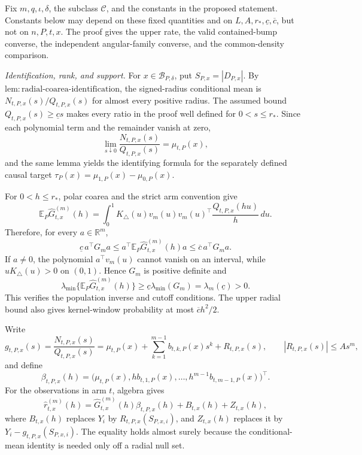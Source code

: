 Fix \(m,q,\iota,\delta\), the subclass \(\mathcal C\), and the constants in the proposed statement.  Constants below may depend on these fixed quantities and on \(L,A,r_*,\underline c,\overline c\), but not on \(n,P,t,x\).  The proof gives the upper rate, the valid contained-bump converse, the independent angular-family converse, and the common-density comparison.

\emph{Identification, rank, and support.}
For \(x\in\mathcal B_{P,\delta}\), put \(S_{P,x}=|D_{P,x}|\).  By \(\mathrm{lem:radial\text{-}coarea\text{-}identification}\), the signed-radius conditional mean is \(N_{t,P,x}(s)/Q_{t,P,x}(s)\) for almost every positive radius.  The assumed bound \(Q_{t,P,x}(s)\geq\underline c s\) makes every ratio in the proof well defined for \(0<s\leq r_*\).  Since each polynomial term and the remainder vanish at zero,
\[
\lim_{s\downarrow0}\frac{N_{t,P,x}(s)}{Q_{t,P,x}(s)}=\mu_{t,P}(x),
\]
and the same lemma yields the identifying formula for the separately defined causal target \(\tau_P(x)=\mu_{1,P}(x)-\mu_{0,P}(x)\).

For \(0<h\leq r_*\), polar coarea and the strict arm convention give
\[
\mathbb E_P\widehat G^{(m)}_{t,x}(h)
=\int_0^1K_\triangle(u)v_m(u)v_m(u)^\top\frac{Q_{t,P,x}(hu)}h\,du.
\]
Therefore, for every \(a\in\mathbb R^m\),
\[
\underline c\,a^\top G_ma
\leq a^\top\mathbb E_P\widehat G^{(m)}_{t,x}(h)a
\leq\overline c\,a^\top G_ma.
\]
If \(a\ne0\), the polynomial \(a^\top v_m(u)\) cannot vanish on an interval, while \(uK_\triangle(u)>0\) on \((0,1)\).  Hence \(G_m\) is positive definite and
\[
\lambda_{\min}\{\mathbb E_P\widehat G^{(m)}_{t,x}(h)\}
\geq\underline c\lambda_{\min}(G_m)=\lambda_m(\underline c)>0.
\]
This verifies the population inverse and cutoff conditions.  The upper radial bound also gives kernel-window probability at most \(\overline c h^2/2\).

Write
\[
g_{t,P,x}(s)=\frac{N_{t,P,x}(s)}{Q_{t,P,x}(s)}
=\mu_{t,P}(x)+\sum_{k=1}^{m-1}b_{t,k,P}(x)s^k+R_{t,P,x}(s),
\qquad |R_{t,P,x}(s)|\leq As^m,
\]
and define
\[
\beta_{t,P,x}(h)=
\bigl(\mu_{t,P}(x),hb_{t,1,P}(x),\ldots,h^{m-1}b_{t,m-1,P}(x)\bigr)^\top.
\]
For the observations in arm \(t\), algebra gives
\[
\widehat r^{(m)}_{t,x}(h)
=\widehat G^{(m)}_{t,x}(h)\beta_{t,P,x}(h)+B_{t,x}(h)+Z_{t,x}(h),
\]
where \(B_{t,x}(h)\) replaces \(Y_i\) by \(R_{t,P,x}(S_{P,x,i})\), and \(Z_{t,x}(h)\) replaces it by \(Y_i-g_{t,P,x}(S_{P,x,i})\).  The equality holds almost surely because the conditional-mean identity is needed only off a radial null set.

